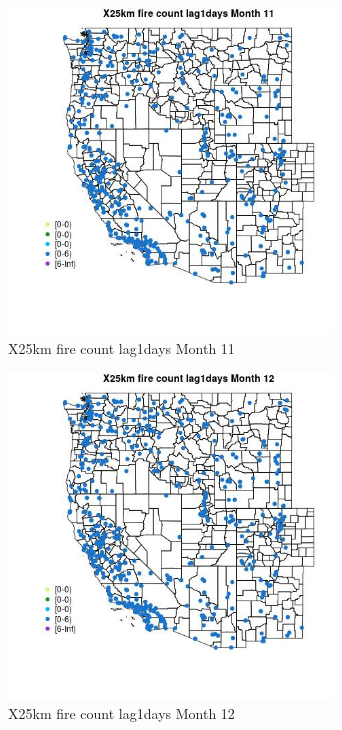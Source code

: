 \begin{figure} 
\centering  
\includegraphics[width=0.77\textwidth]{Code_Outputs/Report_ML_input_PM25_Step4_part_e_de_duplicated_aves_compiled_2019-05-14wNAs_MapObsMo11X25km_fire_count_lag1days.jpg} 
\caption{\label{fig:Report_ML_input_PM25_Step4_part_e_de_duplicated_aves_compiled_2019-05-14wNAsMapObsMo11X25km_fire_count_lag1days}X25km fire count lag1days Month 11} 
\end{figure} 
 

\begin{figure} 
\centering  
\includegraphics[width=0.77\textwidth]{Code_Outputs/Report_ML_input_PM25_Step4_part_e_de_duplicated_aves_compiled_2019-05-14wNAs_MapObsMo12X25km_fire_count_lag1days.jpg} 
\caption{\label{fig:Report_ML_input_PM25_Step4_part_e_de_duplicated_aves_compiled_2019-05-14wNAsMapObsMo12X25km_fire_count_lag1days}X25km fire count lag1days Month 12} 
\end{figure} 
 

